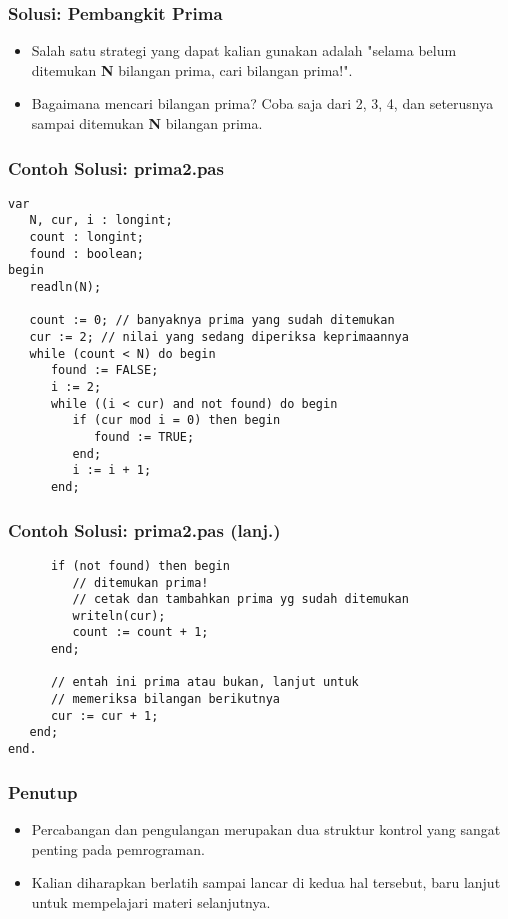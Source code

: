 \documentclass{beamer}
\begin{document}
\begin{frame}
\frametitle{Solusi: Pembangkit Prima}
\begin{itemize}
	\item Salah satu strategi yang dapat kalian gunakan adalah "selama belum ditemukan \textbf{N} bilangan prima, cari bilangan prima!".
	\item Bagaimana mencari bilangan prima? Coba saja dari 2, 3, 4, dan seterusnya sampai ditemukan \textbf{N} bilangan prima.
\end{itemize}
\end{frame}

\begin{frame}[fragile]
\frametitle{Contoh Solusi: prima2.pas}
\begin{lstlisting}
var
   N, cur, i : longint;
   count : longint;
   found : boolean;
begin
   readln(N);

   count := 0; // banyaknya prima yang sudah ditemukan
   cur := 2; // nilai yang sedang diperiksa keprimaannya
   while (count < N) do begin
      found := FALSE;
      i := 2;
      while ((i < cur) and not found) do begin
         if (cur mod i = 0) then begin
            found := TRUE;
         end;
         i := i + 1;
      end;
\end{lstlisting}
\end{frame}

\begin{frame}[fragile]
\frametitle{Contoh Solusi: prima2.pas (lanj.)}
\begin{lstlisting}
      if (not found) then begin
         // ditemukan prima! 
         // cetak dan tambahkan prima yg sudah ditemukan
         writeln(cur);
         count := count + 1;
      end;

      // entah ini prima atau bukan, lanjut untuk 
      // memeriksa bilangan berikutnya
      cur := cur + 1;
   end;
end.
\end{lstlisting}
\end{frame}

\begin{frame}
\frametitle{Penutup}
\begin{itemize}
	\item Percabangan dan pengulangan merupakan dua struktur kontrol yang sangat penting pada pemrograman.
	\item Kalian diharapkan berlatih sampai lancar di kedua hal tersebut, baru lanjut untuk mempelajari materi selanjutnya.
\end{itemize}
\end{frame}
\end{document}
